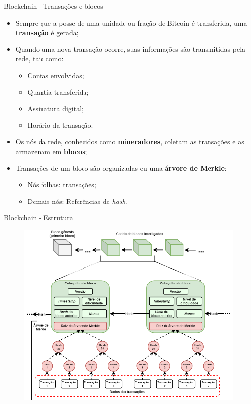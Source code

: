 \begin{frame}{Blockchain - Transações e blocos}
    \begin{itemize}
        \item Sempre que a posse de uma unidade ou fração de Bitcoin é transferida, uma \textbf{transação} é gerada;
        \item Quando uma nova transação ocorre, suas informações são transmitidas pela rede, tais como:
        \begin{itemize}
            \item Contas envolvidas;
            \item Quantia transferida;
            \item Assinatura digital;
            \item Horário da transação.
        \end{itemize}
        \item Os nós da rede, conhecidos como \textbf{mineradores}, coletam as transações e as armazenam em \textbf{blocos};
        \item Transações de um bloco são organizadas eu uma \textbf{árvore de Merkle}:
            \begin{itemize}
                \item Nós folhas: transações;
                \item Demais nós: Referências de \textit{hash}.
            \end{itemize}
    \end{itemize}
\end{frame}

\begin{frame}{Blockchain - Estrutura}
    \begin{figure}[!htb]
     \centering
     \includegraphics[scale=0.3]{figuras/blockchain/block_estrutura_cabeçalho.png}
    \end{figure}    
\end{frame}

